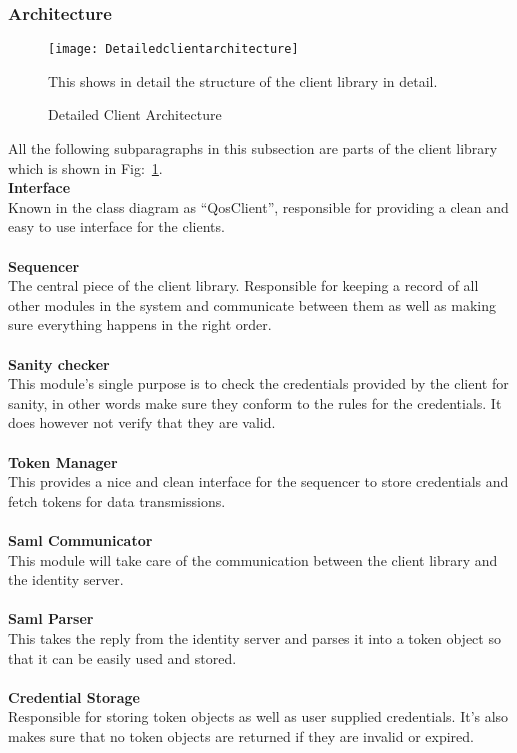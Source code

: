 	\subsubsection{Architecture}\label{client architecture}
		\begin{figure}[h]
			\centering	
			\texttt{[image: Detailedclientarchitecture]}
			\caption{Detailed Client Architecture}
			This shows in detail the structure of the client library in detail. 
			\label{fig:DetailedClientArchitecture}
		\end{figure}

    All the following subparagraphs in this subsection are parts of the client library which is shown in Fig:~\ref{fig:DetailedClientArchitecture}.  \\ 
    
		\indent \textbf{Interface} \\
Known in the class diagram as “QosClient”, responsible for providing a clean and easy to use interface for the clients.
\\\\
		\indent \textbf{Sequencer} \\
The central piece of the client library. Responsible for keeping a record of all other modules in the system and communicate between them as well as making sure everything happens in the right order.
\\\\
		\indent \textbf{Sanity checker} \\
This module's single purpose is to check the credentials provided by the client for sanity, in other words make sure they conform to the rules for the credentials. It does however not verify that they are valid.
\\\\
		\indent \textbf{Token Manager} \\
This provides a nice and clean interface for the sequencer to store credentials and fetch tokens for data transmissions.
\\\\
		\indent \textbf{Saml Communicator} \\
This module will take care of the communication between the client library and the identity server.
\\\\
		\indent \textbf{Saml Parser} \\
This takes the reply from the identity server and parses it into a token object so that it can be easily used and stored.
\\\\
		\indent \textbf{Credential Storage} \\
Responsible for storing token objects as well as user supplied credentials. It's also makes sure that no token objects are returned if they are invalid or expired.

